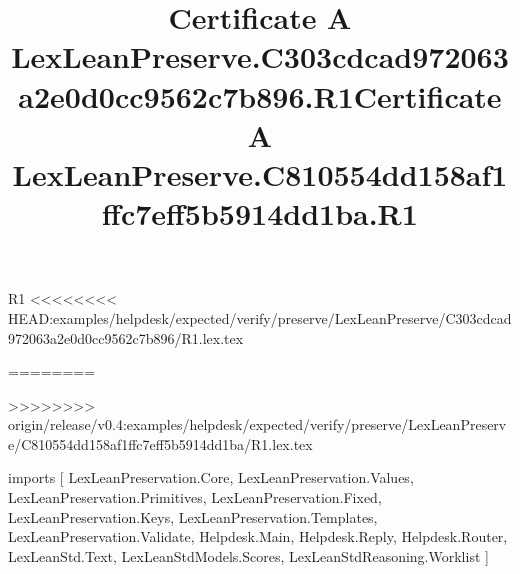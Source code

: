 \begin{lexlean}{R1}
<<<<<<<< HEAD:examples/helpdesk/expected/verify/preserve/LexLeanPreserve/C303cdcad972063a2e0d0cc9562c7b896/R1.lex.tex
\title{Certificate A LexLeanPreserve.C303cdcad972063a2e0d0cc9562c7b896.R1}
========
\title{Certificate A LexLeanPreserve.C810554dd158af1ffc7eff5b5914dd1ba.R1}
>>>>>>>> origin/release/v0.4:examples/helpdesk/expected/verify/preserve/LexLeanPreserve/C810554dd158af1ffc7eff5b5914dd1ba/R1.lex.tex
\begin{coremodule}
imports [
  LexLeanPreservation.Core,
  LexLeanPreservation.Values,
  LexLeanPreservation.Primitives,
  LexLeanPreservation.Fixed,
  LexLeanPreservation.Keys,
  LexLeanPreservation.Templates,
  LexLeanPreservation.Validate,
  Helpdesk.Main,
  Helpdesk.Reply,
  Helpdesk.Router,
  LexLeanStd.Text,
  LexLeanStdModels.Scores,
  LexLeanStdReasoning.Worklist
]


\end{coremodule}
\end{lexlean}
